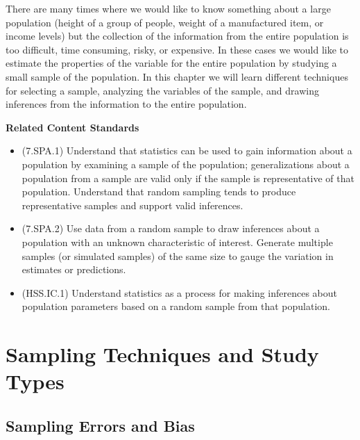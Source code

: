 \documentclass[
]{book}
\providecommand{\tightlist}{%
  \setlength{\itemsep}{0pt}\setlength{\parskip}{0pt}}
\newenvironment{standards}{}{}
\theoremstyle{definition}
\theoremstyle{definition}
\theoremstyle{definition}
\theoremstyle{definition}
\theoremstyle{remark}
\begin{document}
There are many times where we would like to know something about a large population (height of a group of people, weight of a manufactured item, or income levels) but the collection of the information from the entire population is too difficult, time consuming, risky, or expensive. In these cases we would like to estimate the properties of the variable for the entire population by studying a small sample of the population. In this chapter we will learn different techniques for selecting a sample, analyzing the variables of the sample, and drawing inferences from the information to the entire population.

\begin{standards}

\begin{center}
\textbf{Related Content Standards}

\end{center}

\begin{itemize}
\tightlist
\item
  (7.SPA.1) Understand that statistics can be used to gain information about a population by examining a sample of the population; generalizations about a population from a sample are valid only if the sample is representative of that population. Understand that random sampling tends to produce representative samples and support valid inferences.
\item
  (7.SPA.2) Use data from a random sample to draw inferences about a population with an unknown characteristic of interest. Generate multiple samples (or simulated samples) of the same size to gauge the variation in estimates or predictions.
\item
  (HSS.IC.1) Understand statistics as a process for making inferences about population parameters based on a random sample from that population.
\end{itemize}

\end{standards}

\hypertarget{sampling-techniques-and-study-types}{%
\section{Sampling Techniques and Study Types}\label{sampling-techniques-and-study-types}}

\hypertarget{sampling-errors-and-bias}{%
\subsection{Sampling Errors and Bias}\label{sampling-errors-and-bias}}
\end{document}
